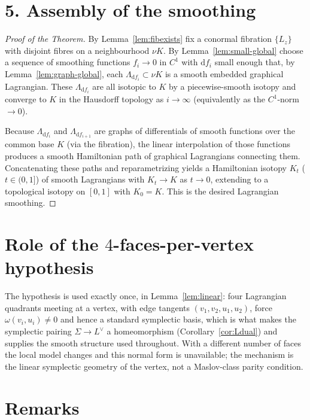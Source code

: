 \documentclass[11pt]{article}
\newcommand{\Ldual}{L^{\vee}}
\newcommand{\dd}{\mathrm d}
\newcommand{\Lag}{\Lambda}
\theoremstyle{definition}
\begin{document}
\section*{5. Assembly of the smoothing}

\begin{proof}[Proof of the Theorem]
By Lemma~\ref{lem:fibexists} fix a conormal fibration $\{L_z\}$ with disjoint
fibres on a neighbourhood $\nu K$. By Lemma~\ref{lem:small-global} choose a
sequence of smoothing functions $f_i\to 0$ in $C^1$ with $\dd f_i$ small enough
that, by Lemma~\ref{lem:graph-global}, each $\Lag_{\dd f_i}\subset\nu K$ is a
smooth embedded graphical Lagrangian. These $\Lag_{\dd f_i}$ are all isotopic to
$K$ by a piecewise-smooth isotopy and converge to $K$ in the Hausdorff topology
as $i\to\infty$ (equivalently as the $C^1$-norm $\to0$).

Because $\Lag_{\dd f_i}$ and $\Lag_{\dd f_{i+1}}$ are graphs of differentials of
smooth functions over the common base $K$ (via the fibration), the linear
interpolation of those functions produces a smooth Hamiltonian path of graphical
Lagrangians connecting them. Concatenating these paths and reparametrizing yields
a Hamiltonian isotopy $K_t$ ($t\in(0,1]$) of smooth Lagrangians with $K_t\to K$
as $t\to0$, extending to a topological isotopy on $[0,1]$ with $K_0=K$. This is
the desired Lagrangian smoothing.
\end{proof}

\section*{Role of the $4$-faces-per-vertex hypothesis}

The hypothesis is used exactly once, in Lemma~\ref{lem:linear}: four Lagrangian
quadrants meeting at a vertex, with edge tangents $(v_1,v_2,u_1,u_2)$, force
$\omega(v_i,u_i)\ne0$ and hence a standard symplectic basis, which is what makes
the symplectic pairing $\Sigma\to\Ldual$ a homeomorphism
(Corollary~\ref{cor:Ldual}) and supplies the smooth structure used throughout.
With a different number of faces the local model changes and this normal form is
unavailable; the mechanism is the linear symplectic geometry of the vertex, not a
Maslov-class parity condition.

\section*{Remarks}
\end{document}
